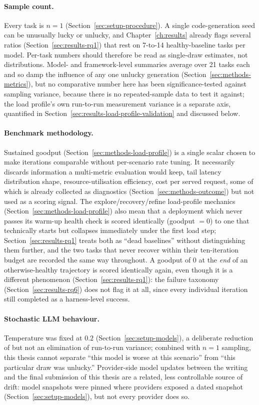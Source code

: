 \paragraph{Sample count.} Every task is $n=1$
(Section~\ref{sec:setup-procedure}). A single code-generation seed can be
unusually lucky or unlucky, and Chapter~\ref{ch:results} already flags
several ratios (Section~\ref{sec:results-rq1}) that rest on 7-to-14
healthy-baseline tasks per model. Per-task numbers should therefore be
read as single-draw estimates, not distributions. Model- and
framework-level summaries average over 21 tasks each and so damp the
influence of any one unlucky generation
(Section~\ref{sec:methods-metrics}), but no comparative number here has
been significance-tested against sampling variance, because there is no
repeated-sample data to test it against; the load profile's own
run-to-run measurement variance is a separate axis, quantified in
Section~\ref{sec:results-load-profile-validation} and discussed below.

\paragraph{Benchmark methodology.} Sustained goodput
(Section~\ref{sec:methods-load-profile}) is a single scalar chosen to make
iterations comparable without per-scenario rate tuning. It necessarily
discards information a multi-metric evaluation would keep, tail latency
distribution shape, resource-utilisation efficiency, cost per served
request, some of which is already collected as diagnostics
(Section~\ref{sec:methods-outcome}) but not used as a scoring signal. The
explore/recovery/refine load-profile mechanics
(Section~\ref{sec:methods-load-profile}) also mean that a deployment which
never passes its warm-up health check is scored identically (goodput
$=0$) to one that technically starts but collapses immediately under the
first load step; Section~\ref{sec:results-rq1} treats both as ``dead
baselines'' without distinguishing them further, and the two tasks that
never recover within their ten-iteration budget are recorded the same way
throughout. A goodput of $0$ at the \emph{end} of an otherwise-healthy
trajectory is scored identically again, even though it is a different
phenomenon (Section~\ref{sec:results-rq1}): the failure taxonomy
(Section~\ref{sec:results-rq6}) does not flag it at all, since every
individual iteration still completed as a harness-level success.

\paragraph{Stochastic LLM behaviour.} Temperature was fixed at $0.2$
(Section~\ref{sec:setup-models}), a deliberate reduction of but not an
elimination of run-to-run variance; combined with $n=1$ sampling, this
thesis cannot separate ``this model is worse at this scenario'' from
``this particular draw was unlucky.'' Provider-side model updates between
the writing and the final submission of this thesis are a related, less
controllable source of drift: model snapshots were pinned where providers
exposed a dated snapshot (Section~\ref{sec:setup-models}), but not every
provider does so.

